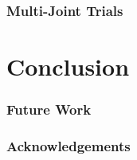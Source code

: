 \documentclass[compress, xcolor=pst]{beamer}
\newcommand\spacingset[1]{\renewcommand{\baselinestretch}%
{#1}\small\normalsize}
\begin{document}
\begin{frame}
	\frametitle{\textbf{Multi-Joint Trials}}
\end{frame}

\section{Conclusion}
\begin{frame}
	\frametitle{\textbf{Future Work}}
\end{frame}

\begin{frame}
	\frametitle{\textbf{Acknowledgements}}
\end{frame}

%
\end{document}
